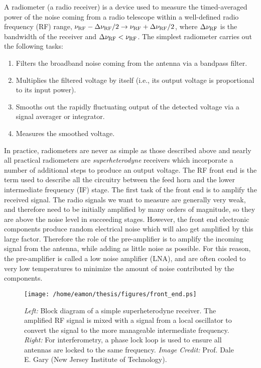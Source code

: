 A radiometer (a radio receiver) is a device  used to measure the  timed-averaged power of the noise coming from a radio telescope within a  well-defined radio frequency (RF) range, $\nu _{\rm{RF}}-\Delta \nu _{\rm{RF}}/2 \rightarrow \nu _{\rm{RF}}+\Delta \nu _{\rm{RF}}/2$, where $\Delta \nu _{\rm{RF}}$ is the bandwidth of the receiver and $\Delta \nu _{\rm{RF}}< \nu _{\rm{RF}}$. 
The simplest radiometer carries out the following tasks:
\begin{enumerate}
\item Filters the broadband noise coming from the antenna via a bandpass filter.
\item Multiplies the filtered voltage by itself (i.e., its output voltage is proportional to its input power).
\item Smooths out the rapidly fluctuating output of the detected voltage via a signal averager or integrator.
\item Measures the smoothed voltage.
\end{enumerate}
In practice, radiometers are never as simple as those described above and nearly all practical radiometers are \textit{superheterodyne} receivers which incorporate a number of additional steps to produce an output voltage. The RF front end is the term used to describe all the circuitry between  the feed horn and the lower intermediate frequency (IF) stage. The first task of the front end is to amplify the received signal. The radio signals we want to measure are generally very weak, and therefore need to be initially amplified by many orders of magnitude, so they are above the noise level in succeeding stages. However, the front end electronic components produce random electrical noise which will also get amplified by this large factor. Therefore the role of the pre-amplifier is to amplify the incoming signal from the antenna, while adding as little noise as possible. For this reason, the pre-amplifier is called a low noise amplifier (LNA), and are often cooled to very low temperatures to minimize the amount of noise contributed by the components.

\begin{figure}[hbt!]
\centering 
          \texttt{[image: /home/eamon/thesis/figures/front\_end.ps]}
\caption[Block diagram of a superheterodyne receiver]{\textit{Left:} Block diagram of a simple superheterodyne receiver. The amplified RF signal is mixed with a signal from a local oscillator to convert the signal to the more manageable intermediate frequency. \textit{Right:} For interferometry, a phase lock loop is used to ensure all antennas are locked to the same frequency. \textit{Image Credit:} Prof. Dale E. Gary (New Jersey Institute of Technology).}
\label{fig2.3}
\end{figure}

